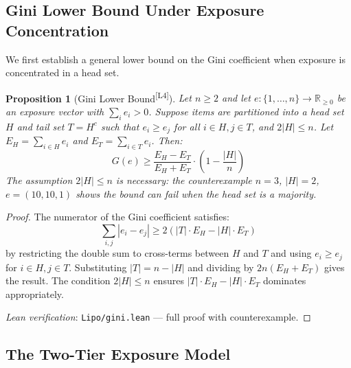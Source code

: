 \documentclass[11pt,a4paper]{article}
\theoremstyle{definition}
\theoremstyle{plain}
\newtheorem{proposition}[theorem]{Proposition}
\theoremstyle{remark}
\newcommand{\R}{\mathbb{R}}
\newcommand{\leanmark}{\textsuperscript{\textcolor{green!50!black}{[L4]}}}
\begin{document}
\subsection{Gini Lower Bound Under Exposure Concentration}
\label{subsec:gini_bound}

We first establish a general lower bound on the Gini coefficient when exposure is concentrated in a head set.

\begin{proposition}[Gini Lower Bound\leanmark]
\label{prop:gini_lower_bound}
Let $n \geq 2$ and let $e: \{1, \ldots, n\} \to \R_{\geq 0}$ be an exposure vector with $\sum_i e_i > 0$. Suppose items are partitioned into a head set $H$ and tail set $T = H^c$ such that $e_i \geq e_j$ for all $i \in H, j \in T$, and $2|H| \leq n$. Let $E_H = \sum_{i \in H} e_i$ and $E_T = \sum_{i \in T} e_i$. Then:
\begin{equation}
    G(e) \geq \frac{E_H - E_T}{E_H + E_T} \cdot \left(1 - \frac{|H|}{n}\right)
\end{equation}
The assumption $2|H| \leq n$ is necessary: the counterexample $n = 3$, $|H| = 2$, $e = (10, 10, 1)$ shows the bound can fail when the head set is a majority.
\end{proposition}

\begin{proof}
The numerator of the Gini coefficient satisfies:
\begin{equation}
    \sum_{i,j} |e_i - e_j| \geq 2\left(|T| \cdot E_H - |H| \cdot E_T\right)
\end{equation}
by restricting the double sum to cross-terms between $H$ and $T$ and using $e_i \geq e_j$ for $i \in H, j \in T$. Substituting $|T| = n - |H|$ and dividing by $2n(E_H + E_T)$ gives the result. The condition $2|H| \leq n$ ensures $|T| \cdot E_H - |H| \cdot E_T$ dominates appropriately.

\smallskip
\noindent\textit{Lean verification}: \texttt{Lipo/gini.lean} --- full proof with counterexample.
\end{proof}

\subsection{The Two-Tier Exposure Model}
\label{subsec:two_tier}
\end{document}
